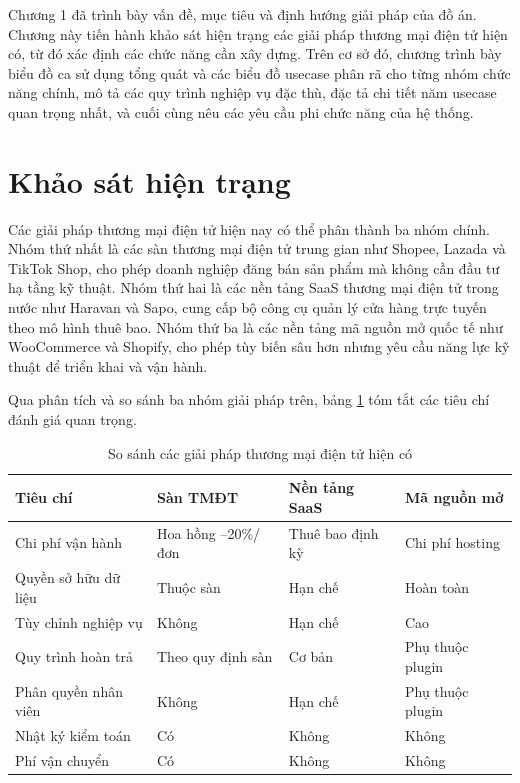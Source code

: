 \documentclass[../DoAn.tex]{subfiles}
\begin{document}
  Chương 1 đã trình bày vấn đề, mục tiêu và định hướng giải pháp của đồ án. Chương
  này tiến hành khảo sát hiện trạng các giải pháp thương mại điện tử hiện có, từ đó
  xác định các chức năng cần xây dựng. Trên cơ sở đó, chương trình bày biểu đồ ca
  sử dụng tổng quát và các biểu đồ usecase phân rã cho từng nhóm chức năng chính,
  mô tả các quy trình nghiệp vụ đặc thù, đặc tả chi tiết năm usecase quan trọng
  nhất, và cuối cùng nêu các yêu cầu phi chức năng của hệ thống.

  \section{Khảo sát hiện trạng}
  \label{section:2.1}

  Các giải pháp thương mại điện tử hiện nay có thể phân thành ba nhóm chính. Nhóm
  thứ nhất là các sàn thương mại điện tử trung gian như Shopee, Lazada và TikTok
  Shop, cho phép doanh nghiệp đăng bán sản phẩm mà không cần đầu tư hạ tầng kỹ
  thuật. Nhóm thứ hai là các nền tảng SaaS thương mại điện tử trong nước như Haravan
  và Sapo, cung cấp bộ công cụ quản lý cửa hàng trực tuyến theo mô hình thuê bao.
  Nhóm thứ ba là các nền tảng mã nguồn mở quốc tế như WooCommerce và Shopify, cho
  phép tùy biến sâu hơn nhưng yêu cầu năng lực kỹ thuật để triển khai và vận hành.

  Qua phân tích và so sánh ba nhóm giải pháp trên, bảng \ref{tab:comparison} tóm
  tắt các tiêu chí đánh giá quan trọng.

  \begin{table}[H]
  \centering
  \caption{So sánh các giải pháp thương mại điện tử hiện có}
  \label{tab:comparison}
  \begin{tabular}{|p{4cm}|p{3cm}|p{3cm}|p{3cm}|}
  \hline
  \textbf{Tiêu chí} & \textbf{Sàn TMĐT} & \textbf{Nền tảng SaaS} & \textbf{Mã nguồn mở} \\
  \hline
  Chi phí vận hành & Hoa hồng \break 5--20\%/đơn & Thuê bao định kỳ & Chi phí hosting \\
  \hline
  Quyền sở hữu dữ liệu & Thuộc sàn & Hạn chế & Hoàn toàn \\
  \hline
  Tùy chỉnh nghiệp vụ & Không & Hạn chế & Cao \\
  \hline
  Quy trình hoàn trả & Theo quy định sàn & Cơ bản & Phụ thuộc \break plugin \\
  \hline
  Phân quyền nhân viên & Không & Hạn chế & Phụ thuộc \break plugin \\
  \hline
  Nhật ký kiểm toán & Có & Không & Không \\
  \hline
  Phí vận chuyển & Có & Không & Không \\
  \hline
  \end{tabular}
  \end{table}
\end{document}
